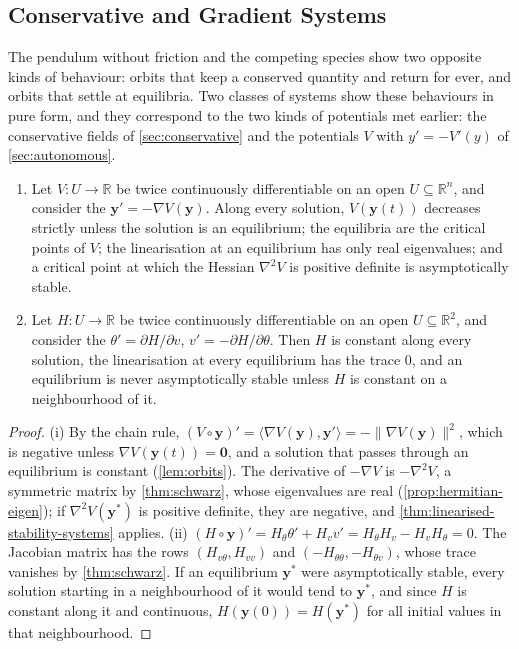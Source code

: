 \subsection{Conservative and Gradient Systems}

The pendulum without friction and the competing species show two opposite kinds of behaviour: orbits that keep a conserved quantity and return for ever, and orbits that settle at equilibria. Two classes of systems show these behaviours in pure form, and they correspond to the two kinds of potentials met earlier: the conservative fields of \cref{sec:conservative} and the potentials $V$ with $y'=-V'(y)$ of \cref{sec:autonomous}.

\begin{proposition}
\label{prop:gradient-hamiltonian}
\leavevmode
\begin{enumerate}
\item Let $V\colon U\to\mathbb R$ be twice continuously differentiable on an open $U\subseteq\mathbb R^n$, and consider the  $\mathbf y'=-\nabla V(\mathbf y)$. Along every solution, $V(\mathbf y(t))$ decreases strictly unless the solution is an equilibrium; the equilibria are the critical points of $V$; the linearisation at an equilibrium has only real eigenvalues; and a critical point at which the Hessian $\nabla^2V$ is positive definite is asymptotically stable.
\item Let $H\colon U\to\mathbb R$ be twice continuously differentiable on an open $U\subseteq\mathbb R^2$, and consider the  $\theta'=\partial H/\partial v$, $v'=-\partial H/\partial\theta$. Then $H$ is constant along every solution, the linearisation at every equilibrium has the trace $0$, and an equilibrium is never asymptotically stable unless $H$ is constant on a neighbourhood of it.
\end{enumerate}
\end{proposition}

\begin{proof}
(i) By the chain rule, $(V\circ\mathbf y)'=\langle\nabla V(\mathbf y),\mathbf y'\rangle=-\|\nabla V(\mathbf y)\|^2$, which is negative unless $\nabla V(\mathbf y(t))=\mathbf 0$, and a solution that passes through an equilibrium is constant (\cref{lem:orbits}). The derivative of $-\nabla V$ is $-\nabla^2V$, a symmetric matrix by \cref{thm:schwarz}, whose eigenvalues are real (\cref{prop:hermitian-eigen}); if $\nabla^2V(\mathbf y^*)$ is positive definite, they are negative, and \cref{thm:linearised-stability-systems} applies. (ii) $(H\circ\mathbf y)'=H_\theta\theta'+H_vv'=H_\theta H_v-H_vH_\theta=0$. The Jacobian matrix has the rows $(H_{v\theta},H_{vv})$ and $(-H_{\theta\theta},-H_{\theta v})$, whose trace vanishes by \cref{thm:schwarz}. If an equilibrium $\mathbf y^*$ were asymptotically stable, every solution starting in a neighbourhood of it would tend to $\mathbf y^*$, and since $H$ is constant along it and continuous, $H(\mathbf y(0))=H(\mathbf y^*)$ for all initial values in that neighbourhood.
\end{proof}

